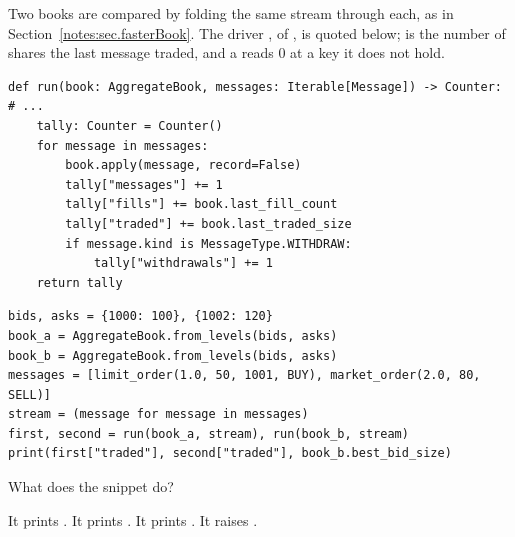 \begin{question}
\label{question.runTwiceOverOneGenerator}
Two books are compared by folding the same stream through each,
as in Section~\ref{notes:sec.fasterBook}.
The driver , of , is quoted below;
 is the number of shares the last message traded,
and a  reads 0 at a key it does not hold.
\begin{lstlisting}[caption={\protect\codehl{unito26.lob.session.run}, its docstring elided.}, label=listing.runTwiceOverOneGeneratorQuote]
def run(book: AggregateBook, messages: Iterable[Message]) -> Counter:
# ...
    tally: Counter = Counter()
    for message in messages:
        book.apply(message, record=False)
        tally["messages"] += 1
        tally["fills"] += book.last_fill_count
        tally["traded"] += book.last_traded_size
        if message.kind is MessageType.WITHDRAW:
            tally["withdrawals"] += 1
    return tally
\end{lstlisting}
\begin{lstlisting}[caption={One stream, two books}, label=listing.runTwiceOverOneGeneratorStream]
bids, asks = {1000: 100}, {1002: 120}
book_a = AggregateBook.from_levels(bids, asks)
book_b = AggregateBook.from_levels(bids, asks)
messages = [limit_order(1.0, 50, 1001, BUY), market_order(2.0, 80, SELL)]
stream = (message for message in messages)
first, second = run(book_a, stream), run(book_b, stream)
print(first["traded"], second["traded"], book_b.best_bid_size)
\end{lstlisting}
What does the snippet do?
\begin{choices}
 \choice It prints .
 \choice It prints .
 \correctchoice It prints .
 \choice It raises .
\end{choices}
\end{question}

